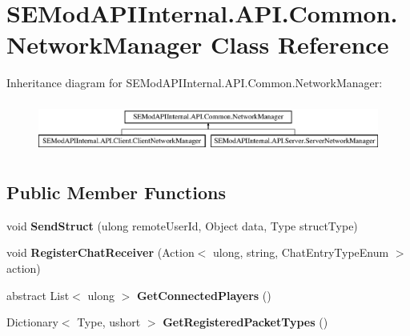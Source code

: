 \hypertarget{class_s_e_mod_a_p_i_internal_1_1_a_p_i_1_1_common_1_1_network_manager}{}\section{S\+E\+Mod\+A\+P\+I\+Internal.\+A\+P\+I.\+Common.\+Network\+Manager Class Reference}
\label{class_s_e_mod_a_p_i_internal_1_1_a_p_i_1_1_common_1_1_network_manager}
Inheritance diagram for S\+E\+Mod\+A\+P\+I\+Internal.\+A\+P\+I.\+Common.\+Network\+Manager\+:\begin{figure}[H]
\begin{center}
\leavevmode
\includegraphics[height=1.696970cm]{class_s_e_mod_a_p_i_internal_1_1_a_p_i_1_1_common_1_1_network_manager}
\end{center}
\end{figure}
\subsection*{Public Member Functions}
\begin{DoxyCompactItemize}
\item 
\hypertarget{class_s_e_mod_a_p_i_internal_1_1_a_p_i_1_1_common_1_1_network_manager_a95f12c1b5a43fdb60154d6fd24625db4}{}void {\bfseries Send\+Struct} (ulong remote\+User\+Id, Object data, Type struct\+Type)\label{class_s_e_mod_a_p_i_internal_1_1_a_p_i_1_1_common_1_1_network_manager_a95f12c1b5a43fdb60154d6fd24625db4}

\item 
\hypertarget{class_s_e_mod_a_p_i_internal_1_1_a_p_i_1_1_common_1_1_network_manager_afeeaf83008ad5f4d63ac67030a5d4fa4}{}void {\bfseries Register\+Chat\+Receiver} (Action$<$ ulong, string, Chat\+Entry\+Type\+Enum $>$ action)\label{class_s_e_mod_a_p_i_internal_1_1_a_p_i_1_1_common_1_1_network_manager_afeeaf83008ad5f4d63ac67030a5d4fa4}

\item 
\hypertarget{class_s_e_mod_a_p_i_internal_1_1_a_p_i_1_1_common_1_1_network_manager_a2ab47eb988b3360150f4863845eff747}{}abstract List$<$ ulong $>$ {\bfseries Get\+Connected\+Players} ()\label{class_s_e_mod_a_p_i_internal_1_1_a_p_i_1_1_common_1_1_network_manager_a2ab47eb988b3360150f4863845eff747}

\item 
\hypertarget{class_s_e_mod_a_p_i_internal_1_1_a_p_i_1_1_common_1_1_network_manager_abf43f81b0e6a8457372140e4d9aa8f66}{}Dictionary$<$ Type, ushort $>$ {\bfseries Get\+Registered\+Packet\+Types} ()\label{class_s_e_mod_a_p_i_internal_1_1_a_p_i_1_1_common_1_1_network_manager_abf43f81b0e6a8457372140e4d9aa8f66}

\end{DoxyCompactItemize}
